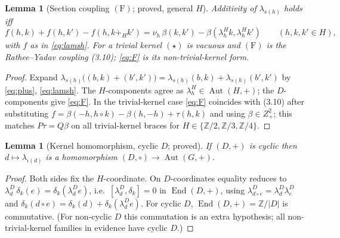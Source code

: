 \documentclass[11pt,reqno]{amsart}
\theoremstyle{plain}
\newtheorem{lemma}[theorem]{Lemma}
\theoremstyle{definition}
\newcommand{\Z}{\mathbb{Z}}
\newcommand{\Aut}{\operatorname{Aut}}
\newcommand{\End}{\operatorname{End}}
\newcommand{\lD}{\lambda^{D}}
\newcommand{\lH}{\lambda^{H}}
\newcommand{\iot}{\iota}
\begin{document}
\begin{lemma}[Section coupling $\mathrm{(F)}$; proved, general $H$]\label{lem:F}
Additivity of $\lambda_{s(h)}$ holds iff
\begin{equation}\label{eq:F}
f(h,k)+f(h,k')-f(h,k+_Hk')=\nu_h\,\beta(k,k')-\beta(\lH_hk,\lH_hk')
\qquad(h,k,k'\in H),\tag{F}
\end{equation}
with $f$ as in \eqref{eq:lamsh}. For a trivial kernel $(\star)$ is vacuous and $\mathrm{(F)}$
is the Rathee--Yadav coupling (3.10); \eqref{eq:F} is its non-trivial-kernel form.
\end{lemma}
\begin{proof}
Expand $\lambda_{s(h)}\big((b,k)+(b',k')\big)=\lambda_{s(h)}(b,k)+\lambda_{s(h)}(b',k')$ by
\eqref{eq:plus}, \eqref{eq:lamsh}. The $H$-components agree as $\lH_h\in\Aut(H,+)$; the
$D$-components give \eqref{eq:F}. In the trivial-kernel case \eqref{eq:F} coincides with
(3.10) after substituting $f=\beta(-h,h\circ k)-\beta(h,-h)+\tau(h,k)$ and using $\beta\in
Z^2_+$; this matches $P\tau=Q\beta$ on all trivial-kernel braces for
$H\in\{\Z/2,\Z/3,\Z/4\}$.
\end{proof}

\begin{lemma}[Kernel homomorphism, cyclic $D$; proved]\label{lem:R1}
If $(D,+)$ is cyclic then $d\mapsto\lambda_{\iot(d)}$ is a homomorphism
$(D,\circ)\to\Aut(G,+)$.
\end{lemma}
\begin{proof}
Both sides fix the $H$-coordinate. On $D$-coordinates equality reduces to
$\lD_d\,\delta_k(e)=\delta_k(\lD_d e)$, i.e.\ $[\lD_d,\delta_k]=0$ in $\End(D,+)$, using
$\lD_{d\circ e}=\lD_d\lD_e$ and $\delta_k(d\circ e)=\delta_k(d)+\delta_k(\lD_d e)$. For
cyclic $D$, $\End(D,+)=\Z/|D|$ is commutative. (For non-cyclic $D$ this commutation is an
extra hypothesis; all non-trivial-kernel families in evidence have cyclic $D$.)
\end{proof}
\end{document}
